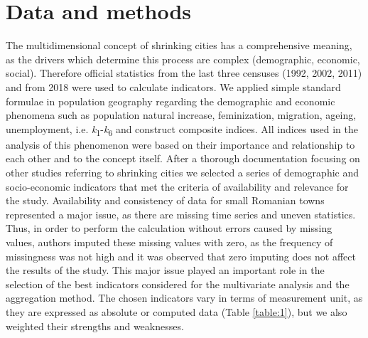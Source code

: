\section{Data and methods}

The multidimensional concept of shrinking cities has a comprehensive meaning, as the drivers which determine this process are complex (demographic, economic, social). Therefore official statistics from the last three censuses (1992, 2002, 2011) and from 2018 were used to calculate indicators. We applied simple standard formulae in population geography regarding the demographic and economic phenomena such as population natural increase, feminization, migration, ageing, unemployment, i.e. \textit{k}\textsubscript{1}-\textit{k}\textsubscript{6} and construct composite indices. All indices used in the analysis of this phenomenon were based on their importance and relationship to each other and to the concept itself. After a thorough documentation focusing on other studies referring to shrinking cities \citep{haase_varieties_2016, hartt_how_2018, mallach_shrinking_2017, rink_addressing_2010, wiechmann_responding_2015, wiechmann_urban_2013} we selected a series of demographic and socio-economic indicators that met the criteria of availability and relevance for the study. Availability and consistency of data for small Romanian towns represented a major issue, as there are missing time series and uneven statistics. Thus, in order to perform the calculation without errors caused by missing values, authors imputed these missing values with zero, as the frequency of missingness was not high and it was observed that zero imputing does not affect the results of the study. This major issue played an important role in the selection of the best indicators considered for the multivariate analysis and the aggregation method. The chosen indicators vary in terms of measurement unit, as they are expressed as absolute or computed data (Table \ref{table:1}), but we also weighted their strengths and weaknesses.

